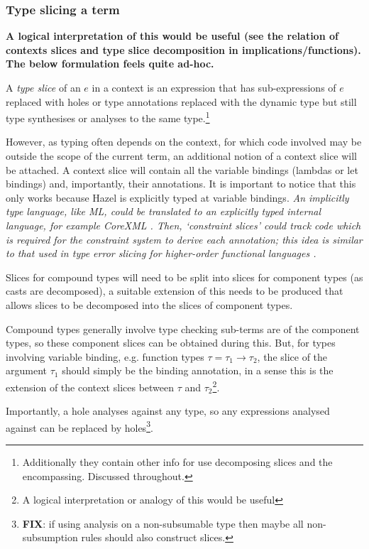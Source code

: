\subsubsection{Type slicing a term}
\textbf{A logical interpretation of this would be useful (see the relation of contexts slices and type slice decomposition in implications/functions). The below formulation feels quite ad-hoc.}
\par
A \textit{type slice} of an $e$ in a context is an expression that has sub-expressions of $e$ replaced with holes or type annotations replaced with the dynamic type but still type synthesises or analyses to the same type.\footnote{Additionally they contain other info for use decomposing slices and the encompassing. Discussed throughout.}\par 
However, as typing often depends on the context, for which code involved may be outside the scope of the current term, an additional notion of a context slice will be attached. A context slice will contain all the variable bindings (lambdas or let bindings) and, importantly, their annotations. It is important to notice that this only works because Hazel is explicitly typed at variable bindings. \textit{An implicitly type language, like ML, could be translated to an explicitly typed internal language, for example CoreXML \cite{CoreXML}. Then, `constraint slices' could track code which is required for the constraint system to derive each annotation; this idea is similar to that used in type error slicing for higher-order functional languages \cite{ErrSlice, HaackErrSlice}.}
\par 
Slices for compound types will need to be split into slices for component types (as casts are decomposed), a suitable extension of this needs to be produced that allows slices to be decomposed into the slices of component types.\par
Compound types generally involve type checking sub-terms are of the component types, so these component slices can be obtained during this. But,
for types involving variable binding, e.g. function types $\tau = \tau_1 \to \tau_2$, the slice of the argument $\tau_1$ should simply be the binding annotation, in a sense this is the extension of the context slices between $\tau$ and $\tau_2$\footnote{A logical interpretation or analogy of this would be useful}.\\ \par 
Importantly, a hole analyses against any type, so any expressions analysed against can be replaced by holes\footnote{\textbf{FIX}: if using analysis on a non-subsumable type then maybe all non-subsumption rules should also construct slices.}.\par 
